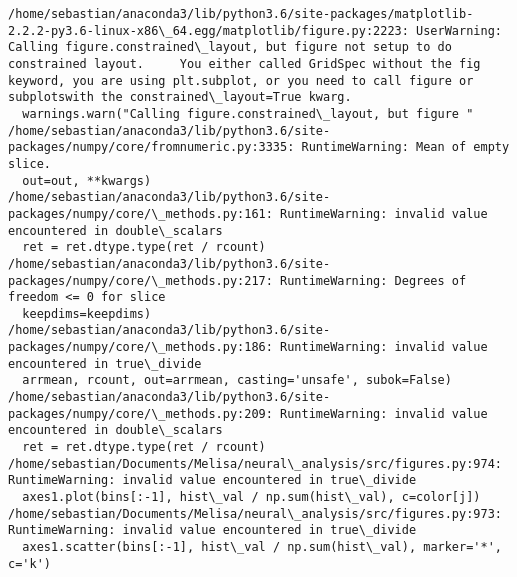 \documentclass[11pt]{article}
\begin{document}
    \begin{Verbatim}[commandchars=\\\{\}]
/home/sebastian/anaconda3/lib/python3.6/site-packages/matplotlib-2.2.2-py3.6-linux-x86\_64.egg/matplotlib/figure.py:2223: UserWarning: Calling figure.constrained\_layout, but figure not setup to do constrained layout.     You either called GridSpec without the fig keyword, you are using plt.subplot, or you need to call figure or subplotswith the constrained\_layout=True kwarg.
  warnings.warn("Calling figure.constrained\_layout, but figure "
/home/sebastian/anaconda3/lib/python3.6/site-packages/numpy/core/fromnumeric.py:3335: RuntimeWarning: Mean of empty slice.
  out=out, **kwargs)
/home/sebastian/anaconda3/lib/python3.6/site-packages/numpy/core/\_methods.py:161: RuntimeWarning: invalid value encountered in double\_scalars
  ret = ret.dtype.type(ret / rcount)
/home/sebastian/anaconda3/lib/python3.6/site-packages/numpy/core/\_methods.py:217: RuntimeWarning: Degrees of freedom <= 0 for slice
  keepdims=keepdims)
/home/sebastian/anaconda3/lib/python3.6/site-packages/numpy/core/\_methods.py:186: RuntimeWarning: invalid value encountered in true\_divide
  arrmean, rcount, out=arrmean, casting='unsafe', subok=False)
/home/sebastian/anaconda3/lib/python3.6/site-packages/numpy/core/\_methods.py:209: RuntimeWarning: invalid value encountered in double\_scalars
  ret = ret.dtype.type(ret / rcount)
/home/sebastian/Documents/Melisa/neural\_analysis/src/figures.py:974: RuntimeWarning: invalid value encountered in true\_divide
  axes1.plot(bins[:-1], hist\_val / np.sum(hist\_val), c=color[j])
/home/sebastian/Documents/Melisa/neural\_analysis/src/figures.py:973: RuntimeWarning: invalid value encountered in true\_divide
  axes1.scatter(bins[:-1], hist\_val / np.sum(hist\_val), marker='*', c='k')

    \end{Verbatim}

    \begin{center}
    \end{center}
    { \hspace*{\fill} \\}
    
    \begin{center}
    \end{center}
    { \hspace*{\fill} \\}
    
\end{document}
